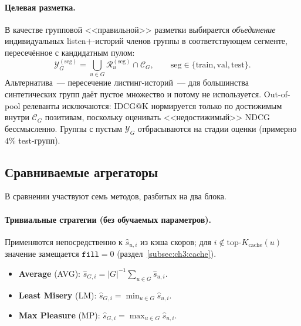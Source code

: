 \paragraph{Целевая разметка.} В качестве групповой <<правильной>> разметки выбирается \emph{объединение} индивидуальных listen+-историй членов группы в соответствующем сегменте, пересечённое с кандидатным пулом:
\begin{equation*}
    \mathcal{Y}_G^{(\mathrm{seg})} = \bigcup_{u \in G} \mathcal{R}_u^{(\mathrm{seg})} \cap \mathcal{C}_G,
    \qquad \mathrm{seg} \in \{\mathrm{train}, \mathrm{val}, \mathrm{test}\}.
\end{equation*}
Альтернатива~--- пересечение листинг-историй~--- для большинства синтетических групп даёт пустое множество и потому не используется. Out-of-pool релеванты исключаются: $\mathrm{IDCG@K}$ нормируется только по достижимым внутри $\mathcal{C}_G$ позитивам, поскольку оценивать <<недостижимый>> NDCG бессмысленно. Группы с пустым $\mathcal{Y}_G$ отбрасываются на стадии оценки (примерно $4\%$ test-групп).

\subsection{Сравниваемые агрегаторы}\label{subsec:ch3:aggregators}

В сравнении участвуют семь методов, разбитых на два блока.

\paragraph{Тривиальные стратегии (без обучаемых параметров).} Применяются непосредственно к $\hat{s}_{u, i}$ из кэша скоров; для $i \notin \mathrm{top}\text{-}K_{\mathrm{cache}}(u)$ значение замещается $\mathtt{fill} = 0$ (раздел~\ref{subsec:ch3:cache}).
\begin{itemize}
    \item \textbf{Average} (AVG): $\hat{s}_{G, i} = |G|^{-1} \sum_{u \in G} \hat{s}_{u, i}$.
    \item \textbf{Least Misery} (LM): $\hat{s}_{G, i} = \min_{u \in G} \hat{s}_{u, i}$.
    \item \textbf{Max Pleasure} (MP): $\hat{s}_{G, i} = \max_{u \in G} \hat{s}_{u, i}$.
\end{itemize}

